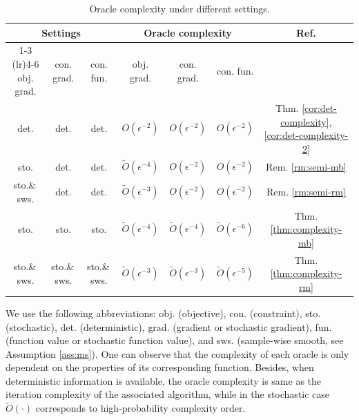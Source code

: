 \documentclass[11pt]{article}
\begin{document}
\begin{table}[htbp]
\centering
\caption{Oracle complexity {under different settings}.}\label{table:results}
\begin{tabular}{ccc|ccc|c}
\toprule
\multicolumn{3}{c|}{\textbf{Settings}} & \multicolumn{3}{c|}{\textbf{Oracle complexity}} & \multirow{2}{*}{\textbf{Ref.}}\\ \cmidrule(lr){1-3} \cmidrule(lr){4-6}
obj. grad. & con. grad. &  con. fun. & obj. grad. & con. grad. & con. fun. & \\ 
\midrule
det. & det. & det. & $O(\epsilon^{-2})$ & $O(\epsilon^{-2})$ & $O(\epsilon^{-2})$ & Thm. \ref{cor:det-complexity}, \ref{cor:det-complexity-2} \\
sto. & det. & det. & {$\tilde O(\epsilon^{-4})$} & $O(\epsilon^{-2})$ & $O(\epsilon^{-2})$ & Rem. \ref{rm:semi-mb}\\
sto.\&\,sws. & det. & det. & $\tilde O(\epsilon^{-3})$ & $O(\epsilon^{-2})$ & $O(\epsilon^{-2})$ & Rem. \ref{rm:semi-rm}\\
sto. & sto. & sto. & $\tilde O(\epsilon^{-4})$ & $\tilde O(\epsilon^{-4})$ & $\tilde O(\epsilon^{-6})$ & Thm.  \ref{thm:complexity-mb}\\
sto.\&\,sws. & sto.\&\,sws. & sto.\&\,sws. & $\tilde O(\epsilon^{-3})$ & $\tilde O(\epsilon^{-3})$ & $\tilde O(\epsilon^{-5})$ &Thm.  \ref{thm:complexity-rm}\\
\bottomrule
\end{tabular}

\smallskip
\parbox{\linewidth}{\footnotesize
We use the following abbreviations: obj.  (objective), con. (constraint), sto.  (stochastic), det.  (deterministic), {grad. (gradient or stochastic gradient), fun. (function value or stochastic function value), and} {sws. (sample-wise smooth, see Assumption \ref{ass:ms})}. One can observe that the complexity of each oracle is only dependent on the properties of its corresponding function. Besides, when deterministic information is available, the oracle  complexity is  same as the iteration complexity of the associated algorithm, while in the stochastic case $\tilde O(\cdot)$ corresponds to high-probability complexity order. 
}
\end{table}
\end{document}
